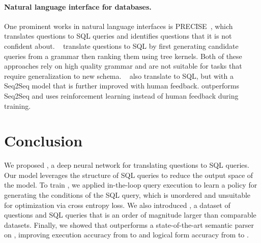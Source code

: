 \documentclass{article} %
\begin{document}
\vspace{-2mm}
\paragraph{Natural language interface for databases.}
One prominent works in natural language interfaces is PRECISE~\citep{popescu-nli}, which translates questions to SQL queries and identifies questions that it is not confident about.
~\citet{Giordani2012TranslatingQT} translate questions to SQL by first generating candidate queries from a grammar then ranking them using tree kernels.
Both of these approaches rely on high quality grammar and are not suitable for tasks that require generalization to new schema.
~\citet{Iyer2017NeuralSemanticUserFeedback} also translate to SQL, but with a Seq2Seq model that is further improved with human feedback.
\model outperforms Seq2Seq and uses reinforcement learning instead of human feedback during training.


\vspace{-1mm}
\section{Conclusion}
\vspace{-2mm}
We proposed \model, a deep neural network for translating questions to SQL queries.
Our model leverages the structure of SQL queries to reduce the output space of the model.
To train \model, we applied in-the-loop query execution to learn a policy for generating the conditions of the SQL query, which is unordered and unsuitable for optimization via cross entropy loss.
We also introduced \dataset, a dataset of questions and SQL queries that is an order of magnitude larger than comparable datasets.
Finally, we showed that \model outperforms a state-of-the-art semantic parser on \dataset, improving execution accuracy from \perfeaseqtoseq to \perfeaours and logical form accuracy from \perflaseqtoseq to \perflaours.







\appendix

\end{document}
